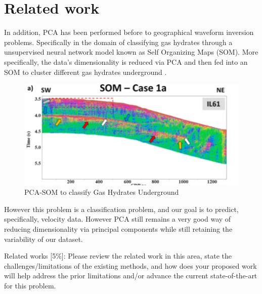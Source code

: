 \documentclass{article}
\newcommand{\instructions}[1]{{\color{blue} #1}}
\begin{document}
    


\section{Related work} 

    In addition, PCA has been performed before to geographical waveform inversion problems. Specifically in the domain of classifying gas hydrates through a unsupervised neural network model known as Self Organizing Maps (SOM). More specifically, the data's dimensionality is reduced via PCA and then fed into an SOM to cluster different gas hydrates underground \cite{jones2023waveform}.  

    \begin{figure}[H]
        \centering
        \includegraphics[width=0.5\linewidth]{figures/related1.png}
        \caption{PCA-SOM to classify Gas Hydrates Underground}
        \label{fig:related1}
    \end{figure}
    
    However this problem is a classification problem, and our goal is to predict, specifically, velocity data. However PCA still remains a very good way of reducing dimensionality via principal components while still retaining the variability of our dataset.


\instructions{Related works [5\%]: Please review the related work in this area, state the challenges/limitations of the existing methods, and how does your proposed work will help address the prior limitations and/or advance the current state-of-the-art for this problem.}
\end{document}
